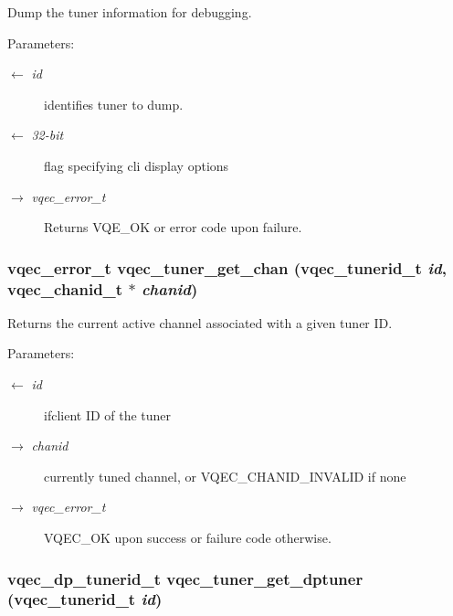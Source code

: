 Dump the tuner information for debugging. \begin{Desc}
\item[Parameters:]
\begin{description}
\item[\mbox{$\leftarrow$} {\em id}]identifies tuner to dump. \item[\mbox{$\leftarrow$} {\em 32-bit}]flag specifying cli display options \item[\mbox{$\rightarrow$} {\em vqec\_\-error\_\-t}]Returns VQE\_\-OK or error code upon failure. \end{description}
\end{Desc}
\subsubsection{\setlength{\rightskip}{0pt plus 5cm}vqec\_\-error\_\-t vqec\_\-tuner\_\-get\_\-chan (vqec\_\-tunerid\_\-t {\em id}, \bf{vqec\_\-chanid\_\-t} $\ast$ {\em chanid})}\label{vqec__tuner_8c_cb607c46e7fc451bd9ae7507f78c06e4}


Returns the current active channel associated with a given tuner ID.

\begin{Desc}
\item[Parameters:]
\begin{description}
\item[\mbox{$\leftarrow$} {\em id}]ifclient ID of the tuner \item[\mbox{$\rightarrow$} {\em chanid}]currently tuned channel, or VQEC\_\-CHANID\_\-INVALID if none \item[\mbox{$\rightarrow$} {\em vqec\_\-error\_\-t}]VQEC\_\-OK upon success or failure code otherwise. \end{description}
\end{Desc}
\subsubsection{\setlength{\rightskip}{0pt plus 5cm}vqec\_\-dp\_\-tunerid\_\-t vqec\_\-tuner\_\-get\_\-dptuner (vqec\_\-tunerid\_\-t {\em id})}\label{vqec__tuner_8c_daf05e0d27cbc7ceaf5485cb9dc404b0}


